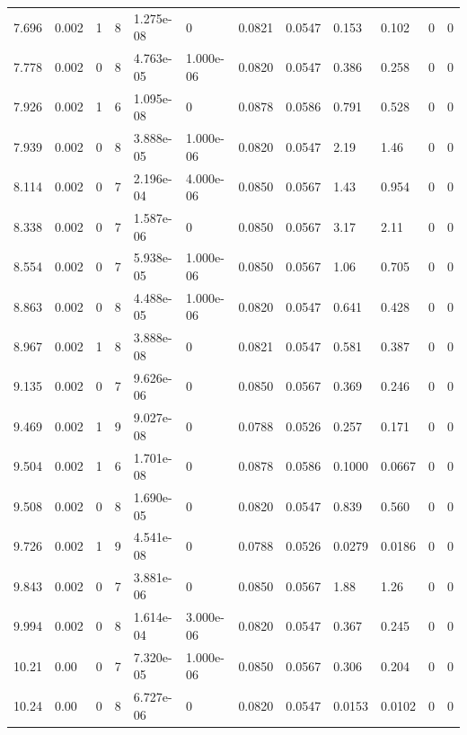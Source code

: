 \documentclass[preview]{standalone}
\begin{document}
{{{\begin{tabular}{L{1.2cm}C{1.2cm} C{0.3cm}C{0.5cm} C{1.4cm}C{1.4cm} C{1.4cm}C{1.4cm} C{1.6cm}C{1.6cm} C{1.6cm}C{1.6cm}}
  7.696  &  0.002  & 1     &  8 &  1.275e-08  & 0  &  0.0821&   0.0547& 0.153 & 0.102   &  0 & 0  \\ 
  7.778  &  0.002  & 0     &  8 &  4.763e-05  & 1.000e-06  &  0.0820&   0.0547& 0.386 & 0.258   &  0 & 0  \\ 
  7.926  &  0.002  & 1     &  6 &  1.095e-08  & 0  &  0.0878&   0.0586& 0.791 & 0.528   &  0 & 0  \\ 
  7.939  &  0.002  & 0     &  8 &  3.888e-05  & 1.000e-06  &  0.0820&   0.0547& 2.19 & 1.46   &  0 & 0  \\ 
  8.114  &  0.002  & 0     &  7 &  2.196e-04  & 4.000e-06  &  0.0850&   0.0567& 1.43 & 0.954   &  0 & 0  \\ 
  8.338  &  0.002  & 0     &  7 &  1.587e-06  & 0  &  0.0850&   0.0567& 3.17 & 2.11   &  0 & 0  \\ 
  8.554  &  0.002  & 0     &  7 &  5.938e-05  & 1.000e-06  &  0.0850&   0.0567& 1.06 & 0.705   &  0 & 0  \\ 
  8.863  &  0.002  & 0     &  8 &  4.488e-05  & 1.000e-06  &  0.0820&   0.0547& 0.641 & 0.428   &  0 & 0  \\ 
  8.967  &  0.002  & 1     &  8 &  3.888e-08  & 0  &  0.0821&   0.0547& 0.581 & 0.387   &  0 & 0  \\ 
  9.135  &  0.002  & 0     &  7 &  9.626e-06  & 0  &  0.0850&   0.0567& 0.369 & 0.246   &  0 & 0  \\ 
  9.469  &  0.002  & 1     &  9 &  9.027e-08  & 0  &  0.0788&   0.0526& 0.257 & 0.171   &  0 & 0  \\ 
  9.504  &  0.002  & 1     &  6 &  1.701e-08  & 0  &  0.0878&   0.0586& 0.1000 & 0.0667   &  0 & 0  \\ 
  9.508  &  0.002  & 0     &  8 &  1.690e-05  & 0  &  0.0820&   0.0547& 0.839 & 0.560   &  0 & 0  \\ 
  9.726  &  0.002  & 1     &  9 &  4.541e-08  & 0  &  0.0788&   0.0526& 0.0279 & 0.0186   &  0 & 0  \\ 
  9.843  &  0.002  & 0     &  7 &  3.881e-06  & 0  &  0.0850&   0.0567& 1.88 & 1.26   &  0 & 0  \\ 
  9.994  &  0.002  & 0     &  8 &  1.614e-04  & 3.000e-06  &  0.0820&   0.0547& 0.367 & 0.245   &  0 & 0  \\ 
  10.21  &  0.00  & 0     &  7 &  7.320e-05  & 1.000e-06  &  0.0850&   0.0567& 0.306 & 0.204   &  0 & 0  \\ 
  10.24  &  0.00  & 0     &  8 &  6.727e-06  & 0  &  0.0820&   0.0547& 0.0153 & 0.0102   &  0 & 0  \\ 

\end{tabular}}}}
\end{document}
